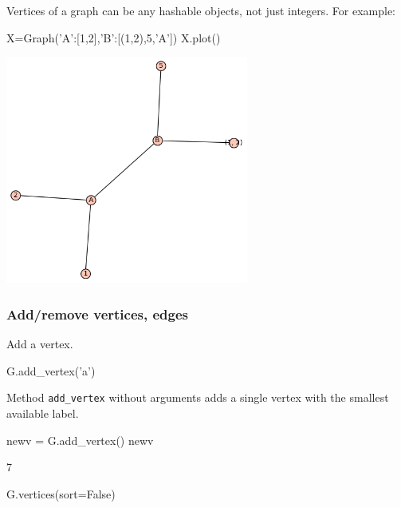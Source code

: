 Vertices of a graph can be any hashable objects, not just integers. For example:
\begin{sageCell}
    X=Graph({'A':[1,2],'B':[(1,2),5,'A']})
    X.plot()
\end{sageCell}
\begin{outImage}
    \includegraphics[width=8cm]{Images/Introduction/output_hashable.png}
\end{outImage}

\subsubsection{Add/remove vertices, edges}

Add a vertex.
\begin{sageCell}
    G.add_vertex('a')
\end{sageCell}

Method \verb|add_vertex| without arguments adds a single vertex with the smallest available label.
\begin{sageCell}
    newv = G.add_vertex()
    newv
\end{sageCell}
\begin{outCell}
    7
\end{outCell}

\begin{sageCell}
    G.vertices(sort=False)
\end{sageCell}
\begin{outCell}
    ['a',7,0,1,2,3,4,5,6]
\end{outCell}



